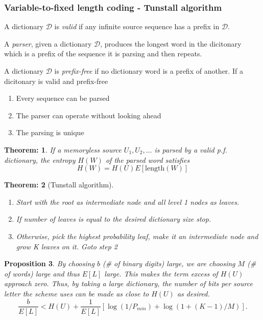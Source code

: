 \documentclass[11pt, a4paper]{scrartcl}
\newtheorem{theorem}{Theorem:}[section]
\newtheorem{proposition}[theorem]{Proposition}
\newenvironment{definition}[1][Definition]{\begin{trivlist}
\item[\hskip \labelsep {\bfseries #1}]}{\end{trivlist}}
\begin{document}
\subsubsection{Variable-to-fixed length coding - Tunstall algorithm}

\begin{definition}
A dictionary $\mathcal{D}$ is \emph{valid} if any infinite source sequence has a
prefix in $\mathcal{D}$.
\end{definition}


\begin{definition}
A \emph{parser}, given a dictionary $\mathcal{D}$, produces the
longest word in the dicitonary which is a prefix of the sequence it is
parsing and then repeats.
\end{definition}


\begin{definition}
  A dictionary $\mathcal{D}$ is \emph{prefix-free} if no dictionary word is a
  prefix of another. If a dicitonary is valid and prefix-free

  \begin{enumerate}
    \item Every sequence can be parsed
      \item The parser can operate without looking ahead
      \item The parsing is unique
  \end{enumerate}
\end{definition}


\begin{theorem}
  If a memoryless source $U_1,U_2,\dots$ is parsed by a valid
  p.f. dictionary, the entropy $H(W)$ of the parsed word satisfies 
$$H(W)=H(U)E[\mathrm{length}(W)]$$
\end{theorem}

\begin{theorem} [Tunstall algorithm]
\begin{enumerate}
\item Start with the root as intermediate node and all level 1 nodes as leaves.
\item If number of leaves is equal to the desired dictionary size stop.
\item Otherwise, pick the highest probability leaf, make it an intermediate node and grow
K leaves on it. Goto step 2
\end{enumerate}
\end{theorem}

\begin{proposition} 
By choosing $b$ (\# of binary digits) large, we are choosing $M$ (\# of words) large and thus $E[L]$ large. This makes the term excess of $H(U)$ approach zero. Thus, by taking a large dictionary, the number of bits per
source letter the scheme uses can be made as close to $H(U)$ as desired.
$$ \frac b {E[L]}< H(U) +\frac1{E[L]} [ \log(1/P_{min}) + \log(1+(K-1)/M)]. $$
\end{proposition}
\end{document}
